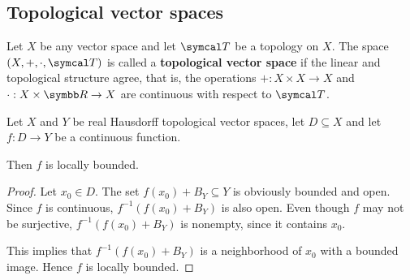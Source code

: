 \subsection{Topological vector spaces}\label{subsec:topological_vector_spaces}

\begin{definition}\label{def:topological_vector_space}
  Let \( X \) be any vector space and let \( \Cal{T} \) be a topology on \( X \). The space \( (X, +, \cdot, \Cal{T}) \) is called a \textbf{topological vector space} if the linear and topological structure agree, that is, the operations \( +: X \times X \to X \) and \( \cdot: X \times \BB{R} \to X \) are continuous with respect to \( \Cal{T} \).
\end{definition}

\begin{proposition}\label{thm:continuous_implies_locally_bounded}
  Let \( X \) and \( Y \) be real Hausdorff topological vector spaces, let \( D \subseteq X \) and let \( f: D \to Y \) be a continuous function.

  Then \( f \) is locally bounded.
\end{proposition}
\begin{proof}
  Let \( x_0 \in D \). The set \( f(x_0) + B_Y \subseteq Y \) is obviously bounded and open. Since \( f \) is continuous, \( f^{-1}(f(x_0) + B_Y) \) is also open. Even though \( f \) may not be surjective, \( f^{-1}(f(x_0) + B_Y) \) is nonempty, since it contains \( x_0 \).

  This implies that \( f^{-1}(f(x_0) + B_Y) \) is a neighborhood of \( x_0 \) with a bounded image. Hence \( f \) is locally bounded.
\end{proof}
